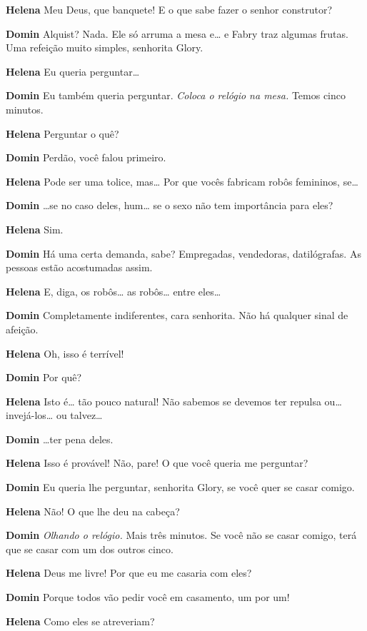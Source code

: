 \textbf{Helena} Meu Deus, que banquete! E o que sabe fazer o senhor construtor?

\textbf{Domin} Alquist? Nada. Ele só arruma a mesa e\ldots{} e Fabry traz algumas frutas. Uma
refeição muito simples, senhorita Glory.

\textbf{Helena} Eu queria perguntar\ldots{}

\textbf{Domin} Eu também queria perguntar. \emph{Coloca o relógio na mesa.} Temos
cinco minutos.

\textbf{Helena} Perguntar o quê?

\textbf{Domin} Perdão, você falou primeiro.

\textbf{Helena} Pode ser uma tolice, mas\ldots{} Por que vocês fabricam robôs femininos, se\ldots{}

\textbf{Domin} \ldots{}se no caso deles, hum\ldots{} se o sexo não tem importância para eles?

\textbf{Helena} Sim.

\textbf{Domin} Há uma certa demanda, sabe? Empregadas, vendedoras, datilógrafas. As
pessoas estão acostumadas assim.

\textbf{Helena} E, diga, os robôs\ldots{} as robôs\ldots{} entre eles\ldots{} 

\textbf{Domin} Completamente indiferentes, cara senhorita. Não há qualquer sinal de
afeição.

\textbf{Helena} Oh, isso é terrível!

\textbf{Domin} Por quê?

\textbf{Helena} Isto é\ldots{} tão pouco natural! Não sabemos se devemos ter repulsa ou\ldots{} invejá-los\ldots{} ou talvez\ldots{}

\textbf{Domin} \ldots{}ter pena deles.

\textbf{Helena} Isso é provável! Não, pare! O que você queria me perguntar?

\textbf{Domin} Eu queria lhe perguntar, senhorita Glory, se você quer se casar comigo.

\textbf{Helena} Não! O que lhe deu na cabeça?

\textbf{Domin} \emph{Olhando o relógio.} Mais três minutos. Se você não se casar
comigo, terá que se casar com um dos outros cinco.

\textbf{Helena} Deus me livre! Por que eu me casaria com eles?

\textbf{Domin} Porque todos vão pedir você em casamento, um por um!

\textbf{Helena} Como eles se atreveriam?


